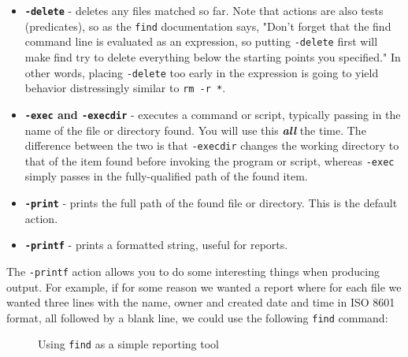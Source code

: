 \documentclass[10pt,american,]{book}
\newenvironment{Shaded}{\begin{snugshade}}{\end{snugshade}}
\newcommand{\KeywordTok}[1]{\textcolor[rgb]{0.13,0.29,0.53}{\textbf{{#1}}}}
\newcommand{\StringTok}[1]{\textcolor[rgb]{0.31,0.60,0.02}{{#1}}}
\newcommand{\NormalTok}[1]{{#1}}
\numberwithin{figure}{chapter}
\DeclareRobustCommand{\drcap}[1]{\begin{figure}[H]\caption{#1}\end{figure}}
\renewcommand{\KeywordTok}[1]{{#1}}
\renewcommand{\StringTok}[1]{{#1}}
\renewcommand{\NormalTok}[1]{{#1}}
\begin{document}
\begin{itemize}
\item
  \textbf{\texttt{-delete}} - deletes any files matched so far. Note
  that actions are also tests (predicates), so as the \texttt{find}
  documentation says, "Don't forget that the find command line is
  evaluated as an expression, so putting \texttt{-delete} first will
  make find try to delete everything below the starting points you
  specified." In other words, placing \texttt{-delete} too early in the
  expression is going to yield behavior distressingly similar to
  \texttt{rm\ -r\ *}.
\item
  \textbf{\texttt{-exec} and \texttt{-execdir}} - executes a command or
  script, typically passing in the name of the file or directory found.
  You will use this \textbf{\emph{all}} the time. The difference between
  the two is that \texttt{-execdir} changes the working directory to
  that of the item found before invoking the program or script, whereas
  \texttt{-exec} simply passes in the fully-qualified path of the found
  item.
\item
  \textbf{\texttt{-print}} - prints the full path of the found file or
  directory. This is the default action.
\item
  \textbf{\texttt{-printf}} - prints a formatted string, useful for
  reports.
\end{itemize}

The \texttt{-printf} action allows you to do some interesting things
when producing output. For example, if for some reason we wanted a
report where for each file we wanted three lines with the name, owner
and created date and time in ISO 8601 format, all followed by a blank
line, we could use the following \texttt{find} command:

\drcap{Using \texttt{find} as a simple reporting tool}

\begin{Shaded}
\end{Shaded}
\end{document}
